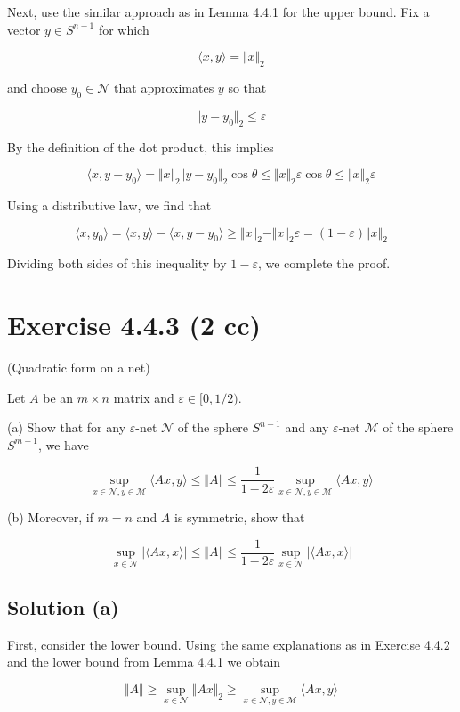 \documentclass{article}
\begin{document}
Next, use the similar approach as in Lemma 4.4.1 for the upper bound. Fix a vector $y \in S^{n-1}$ for which

$$\langle x, y \rangle = \Vert x \Vert_2 $$

and choose $y_0 \in \mathcal N$ that approximates $y$ so that

$$\Vert y - y_0 \Vert_2 \leq \varepsilon$$

By the definition of the dot product, this implies

$$\langle x, y - y_0 \rangle = \Vert x \Vert_2 \Vert y - y_0 \Vert_2 \cos \theta \leq  \Vert x \Vert_2 \varepsilon \cos \theta \leq \Vert x \Vert_2 \varepsilon$$

Using a distributive law, we find that

$$\langle x, y_0 \rangle = \langle x, y \rangle - \langle x, y - y_0 \rangle \geq \Vert x \Vert_2 - \Vert x \Vert_2 \varepsilon = (1 - \varepsilon) \Vert x \Vert_2$$

Dividing both sides of this inequality by $1 - \varepsilon$, we complete the proof.

\section{Exercise 4.4.3 (2 cc)}
(Quadratic form on a net)

Let $A$ be an $m \times n$ matrix and $\varepsilon \in [0, 1/2)$.

(a) Show that for any $\varepsilon$-net $\mathcal N$ of the sphere $S^{n-1}$ and any $\varepsilon$-net $\mathcal M$ of the sphere $S^{m-1}$, we have

$$\sup_{x \in \mathcal N, y \in \mathcal M} \langle Ax, y \rangle \leq \Vert A \Vert \leq \frac{1}{1 - 2\varepsilon}\sup_{x \in \mathcal N, y \in \mathcal M} \langle Ax, y \rangle$$

(b) Moreover, if $m = n$ and $A$ is symmetric, show that

$$\sup_{x \in \mathcal N} | \langle Ax, x \rangle | \leq \Vert A \Vert \leq \frac{1}{1 - 2\varepsilon}\sup_{x \in \mathcal N} | \langle Ax, x \rangle |$$

\subsection{Solution (a)}

First, consider the lower bound. Using the same explanations as in Exercise 4.4.2 and the lower bound from Lemma 4.4.1 we obtain

$$\Vert A \Vert \geq\sup_{x \in \mathcal N} \Vert Ax \Vert_2 \geq \sup_{x \in \mathcal N, y \in \mathcal M} \langle Ax, y \rangle$$
\end{document}
